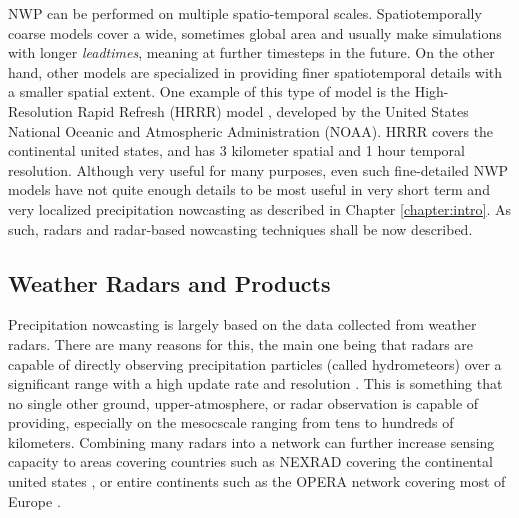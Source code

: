 NWP can be performed on multiple spatio-temporal scales. Spatiotemporally coarse models cover a wide, sometimes global area and usually make simulations with longer \textit{leadtimes}, meaning at further timesteps in the future. On the other hand, other models are specialized in providing finer spatiotemporal details with a smaller spatial extent. One example of this type of model is the High-Resolution Rapid Refresh (HRRR) model \cite{alexander2020rapid}, developed by the United States National Oceanic and Atmospheric Administration (NOAA). HRRR covers the continental united states, and has 3 kilometer spatial and 1 hour temporal resolution. Although very useful for many purposes, even such fine-detailed NWP models have not quite enough details to be most useful in very short term and very localized precipitation nowcasting \cite{radhakrishnan2020casa} as described in Chapter \ref{chapter:intro}. As such, radars and radar-based nowcasting techniques shall be now described.

\subsection*{Weather Radars and Products}

	

Precipitation nowcasting is largely based on the data collected from weather radars. 
There are many reasons for this, the main one being that radars are capable of directly observing precipitation particles (called hydrometeors) over a significant range with a high update rate and resolution \cite{schmid2019nowcasting}. This is something that no single other ground, upper-atmosphere, or radar observation is capable of providing, especially on the mesocscale ranging from tens to hundreds of kilometers. Combining many radars into a network can further increase sensing capacity to areas covering countries such as NEXRAD covering the continental united states \cite{noauthor_next_2020}, or entire continents such as the OPERA network covering most of Europe \cite{saltikoff_opera_2019}. 


